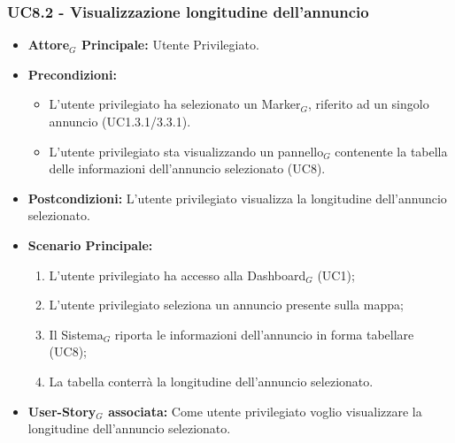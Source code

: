 \documentclass[10pt]{article}
\begin{document}
\begin{justify}
 \subsubsection{\textbf{UC8.2 - Visualizzazione longitudine dell'annuncio}}
 \begin{itemize}
     \item \textbf{Attore$_G$ Principale:} Utente Privilegiato.
     \item \textbf{Precondizioni:}
       \begin{itemize}
    	        \item L'utente privilegiato ha selezionato un Marker$_G$, riferito ad un singolo annuncio (UC1.3.1/3.3.1).
          \item L'utente privilegiato sta visualizzando un pannello$_G$ contenente la tabella delle informazioni dell'annuncio selezionato (UC8).
       \end{itemize}
     \item \textbf{Postcondizioni:} L'utente privilegiato visualizza la longitudine dell'annuncio selezionato.
     \item \textbf{Scenario Principale:}
        \begin{enumerate}
            \item L'utente privilegiato ha accesso alla Dashboard$_G$ (UC1);
            \item L'utente privilegiato seleziona un annuncio presente sulla mappa;
            \item Il Sistema$_G$ riporta le informazioni dell'annuncio in forma tabellare (UC8);
            \item La tabella conterrà la longitudine dell'annuncio selezionato.
        \end{enumerate}
     \item \textbf{User-Story$_G$ associata:} Come utente privilegiato voglio visualizzare la longitudine dell'annuncio selezionato. 
 \end{itemize}

\end{justify}
\end{document}
